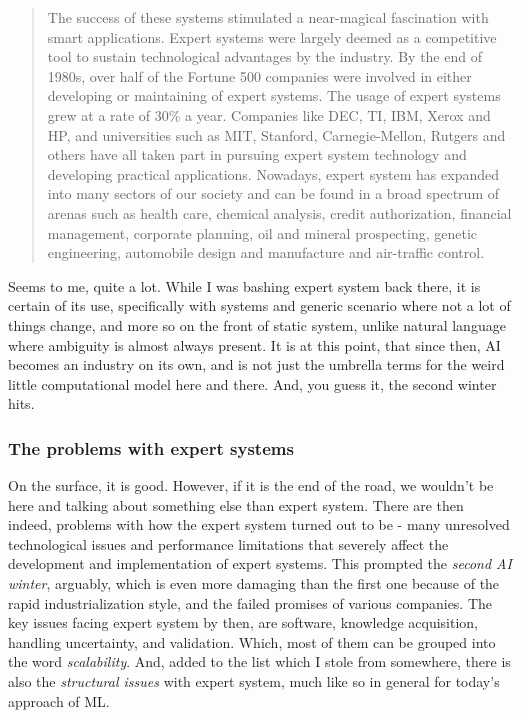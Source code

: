 \begin{quote}
    The success of these systems stimulated a near-magical fascination with smart applications. Expert systems were largely deemed as a competitive tool to sustain technological advantages by the industry. By the end of 1980s, over half of the Fortune 500 companies were involved in either developing or maintaining of expert systems. The usage of expert systems grew at a rate of 30\% a year. Companies like DEC, TI, IBM, Xerox and HP, and universities such as MIT, Stanford, Carnegie-Mellon, Rutgers and others have all taken part in pursuing expert system technology and developing practical applications. Nowadays, expert system has expanded into many sectors of our society and can be found in a broad spectrum of arenas such as health care, chemical analysis, credit authorization, financial management, corporate planning, oil and mineral prospecting, genetic engineering, automobile design and manufacture and air-traffic control.
\end{quote}

Seems to me, quite a lot. While I was bashing expert system back there, it is certain of its use, specifically with systems and generic scenario where not a lot of things change, and more so on the front of static system, unlike natural language where ambiguity is almost always present. It is at this point, that since then, AI becomes an industry on its own, and is not just the umbrella terms for the weird little computational model here and there. And, you guess it, the second winter hits.
\subsubsection{The problems with expert systems}
On the surface, it is good. However, if it is the end of the road, we wouldn't be here and talking about something else than expert system. There are then indeed, problems with how the expert system turned out to be - many unresolved technological issues and performance limitations that severely affect the development and implementation of expert systems. This prompted the \textit{second AI winter}, arguably, which is even more damaging than the first one because of the rapid industrialization style, and the failed promises of various companies. The key issues facing expert system by then, are software, knowledge acquisition, handling uncertainty, and validation. Which, most of them can be grouped into the word \textit{scalability}. And, added to the list which I stole from somewhere, there is also the \textit{structural issues} with expert system, much like so in general for today's approach of ML. 

